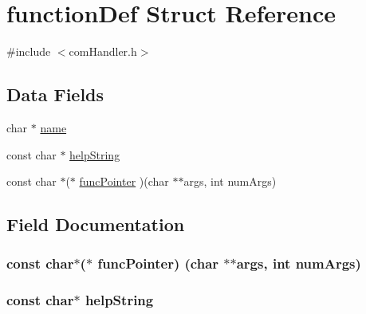 \hypertarget{structfunction_def}{}\section{function\+Def Struct Reference}
\label{structfunction_def}


{\ttfamily \#include $<$com\+Handler.\+h$>$}

\subsection*{Data Fields}
\begin{DoxyCompactItemize}
\item 
char $\ast$ \hyperlink{structfunction_def_a5ac083a645d964373f022d03df4849c8}{name}
\item 
const char $\ast$ \hyperlink{structfunction_def_ab4c259a269a580945600ed07ecaebffa}{help\+String}
\item 
const char $\ast$($\ast$ \hyperlink{structfunction_def_a00d6d4cc8307840fbc601f6fa55dafa3}{func\+Pointer} )(char $\ast$$\ast$args, int num\+Args)
\end{DoxyCompactItemize}


\subsection{Field Documentation}
\subsubsection[{\texorpdfstring{func\+Pointer}{funcPointer}}]{\setlength{\rightskip}{0pt plus 5cm}const char$\ast$($\ast$ func\+Pointer) (char $\ast$$\ast$args, int num\+Args)}\hypertarget{structfunction_def_a00d6d4cc8307840fbc601f6fa55dafa3}{}\label{structfunction_def_a00d6d4cc8307840fbc601f6fa55dafa3}
\subsubsection[{\texorpdfstring{help\+String}{helpString}}]{\setlength{\rightskip}{0pt plus 5cm}const char$\ast$ help\+String}\hypertarget{structfunction_def_ab4c259a269a580945600ed07ecaebffa}{}\label{structfunction_def_ab4c259a269a580945600ed07ecaebffa}
